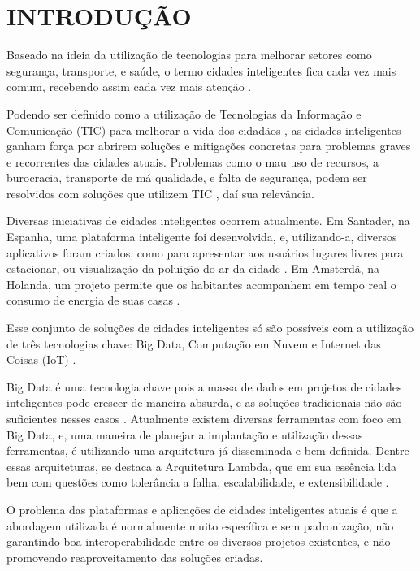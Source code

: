 \chapter[INTRODUÇÃO]{INTRODUÇÃO}



Baseado na ideia da utilização de tecnologias para melhorar setores como
segurança, transporte, e saúde, o termo cidades inteligentes fica cada vez
mais comum, recebendo assim cada vez mais atenção \cite{batty2012smart}.

Podendo ser definido como a utilização de Tecnologias da Informação e
Comunicação (TIC) para melhorar a vida dos cidadãos \cite{batty2012smart},
as cidades inteligentes ganham força por abrirem soluções e mitigações
concretas para problemas graves e recorrentes das cidades atuais. Problemas
como o mau uso de recursos, a burocracia, transporte de má qualidade,
e falta de segurança, podem ser resolvidos com soluções que utilizem TIC
\cite{batty2012smart}, daí sua relevância.

Diversas iniciativas de cidades inteligentes ocorrem atualmente. Em Santader,
na Espanha, uma plataforma inteligente foi desenvolvida, e, utilizando-a,
diversos aplicativos foram criados, como para apresentar aos usuários lugares
livres para estacionar, ou visualização da poluição do ar da
cidade \cite{santana2016software}. Em Amsterdã, na Holanda, um projeto permite
que os habitantes acompanhem em tempo real o consumo de energia de suas
casas \cite{kon2016}.

Esse conjunto de soluções de cidades inteligentes só são possíveis com a
utilização de três tecnologias chave: Big Data, Computação em Nuvem e Internet
das Coisas (IoT) \cite{delesposte2017}.

Big Data é uma tecnologia chave pois a massa de dados em projetos de cidades
inteligentes pode crescer de maneira absurda, e as soluções tradicionais não
são suficientes nesses casos \cite{batty2012smart}. Atualmente existem diversas
ferramentas com foco em Big Data, e, uma maneira de planejar a implantação
e utilização dessas ferramentas, é utilizando uma arquitetura já disseminada e
bem definida. Dentre essas arquiteturas, se destaca a Arquitetura Lambda, que
em sua essência lida bem com questões como tolerância a falha, escalabilidade,
e extensibilidade \cite{marz2015}.

O problema das plataformas e aplicações de cidades inteligentes atuais é que
a abordagem utilizada é normalmente muito específica e sem padronização,
não garantindo boa interoperabilidade entre os diversos projetos existentes, e
não promovendo reaproveitamento das soluções \cite{delesposte2017} criadas.

